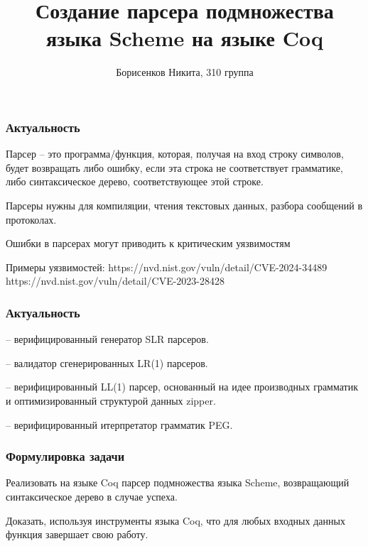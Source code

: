 \documentclass[10pt,a4paper]{beamer}
\author{Борисенков Никита, 310 группа}
\title{Создание парсера подмножества языка Scheme на языке Coq}
\date{}
\begin{document}
\maketitle

%

\begin{frame}
\frametitle{Актуальность}

Парсер -- это программа/функция, которая, получая на вход строку символов, будет возвращать либо ошибку, если эта строка не соответствует грамматике, либо синтаксическое дерево, соответствующее этой строке.

Парсеры нужны для компиляции, чтения текстовых данных, разбора сообщений в протоколах.

Ошибки в парсерах могут приводить к критическим уязвимостям

Примеры уязвимостей:
https://nvd.nist.gov/vuln/detail/CVE-2024-34489
https://nvd.nist.gov/vuln/detail/CVE-2023-28428

\end{frame}

\begin{frame}
\frametitle{Актуальность}

\cite{barthwal_verified_2009} -- верифицированный генератор SLR парсеров.

\cite{hutchison_validating_2012} -- валидатор сгенерированных LR(1) парсеров.

\cite{edelmann_ll1_2020} -- верифицированный LL(1) парсер, основанный на идее производных грамматик и оптимизированный структурой данных zipper.

\cite{blaudeau_verified_2020} -- верифицированный итерпретатор грамматик PEG.

\end{frame}

\begin{frame}
\frametitle{Формулировка задачи}

Реализовать на языке Coq парсер подмножества языка Scheme, возвращающий синтаксическое дерево в случае успеха.

Доказать, используя инструменты языка Coq, что для любых входных данных функция завершает свою работу.


\end{frame}
\end{document}
